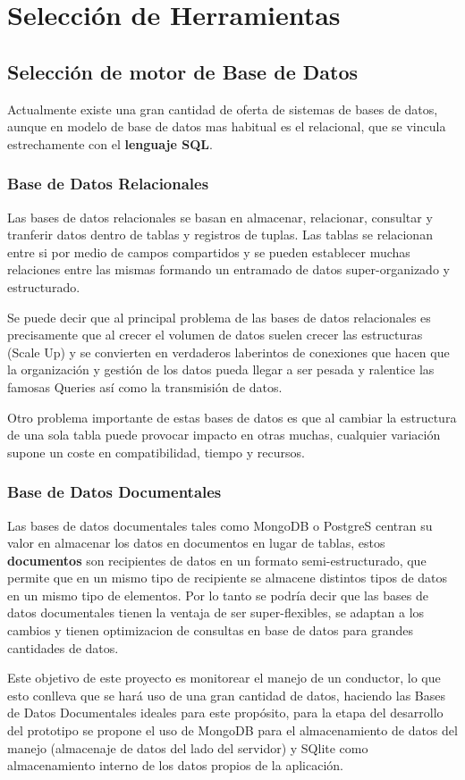 \section{Selección de Herramientas}
\subsection{Selección de motor de Base de Datos}
Actualmente existe una gran cantidad de oferta de sistemas de bases de datos, aunque en modelo de base de datos mas habitual es el relacional, que se vincula estrechamente con el \textbf{lenguaje SQL}.
\subsubsection{Base de Datos Relacionales}
Las bases de datos relacionales se basan en almacenar, relacionar, consultar y tranferir datos dentro de tablas y registros de tuplas. Las tablas se relacionan entre si por medio de campos compartidos y se pueden establecer muchas relaciones entre las mismas formando un entramado de datos super-organizado y estructurado.

Se puede decir que al principal problema de las bases de datos relacionales es precisamente que al crecer el volumen de datos suelen crecer las estructuras (Scale Up) y se convierten en verdaderos laberintos de conexiones que hacen que la organización y gestión de los datos pueda llegar a ser pesada y ralentice las famosas Queries así como la transmisión de datos.

Otro problema importante de estas bases de datos es que al cambiar la estructura de una sola tabla puede provocar impacto en otras muchas, cualquier variación supone un coste en compatibilidad, tiempo y recursos.
\subsubsection{Base de Datos Documentales}
Las bases de datos documentales tales como MongoDB o PostgreS centran su valor en almacenar los datos en documentos en lugar de tablas, estos \textbf{documentos} son recipientes de datos en un formato semi-estructurado, que permite que en un mismo tipo de recipiente se almacene distintos tipos de datos en un mismo tipo de elementos. Por lo tanto se podría decir que las bases de datos documentales tienen la ventaja de ser super-flexibles, se adaptan a los cambios y tienen optimizacion de consultas en base de datos para grandes cantidades de datos.

Este objetivo de este proyecto es monitorear el manejo de un conductor, lo que esto conlleva que se hará uso de una gran cantidad de datos, haciendo las Bases de Datos Documentales ideales para este propósito, para la etapa del desarrollo del prototipo se propone el uso de MongoDB para el almacenamiento de datos del manejo (almacenaje de datos del lado del servidor) y SQlite como almacenamiento interno de los datos propios de la aplicación.
